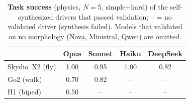 \begin{table}[H]
\centering\small
\setlength{\tabcolsep}{4pt}
\begin{tabular}{lcccc}
\toprule
 & \textbf{Opus} & \textbf{Sonnet} & \textbf{Haiku} & \textbf{DeepSeek} \\
\midrule
Skydio~X2 (fly)  & 1.00 & 0.95 & 1.00 & 0.82 \\
Go2 (walk)       & 0.70 & 0.82 & --   & --   \\
H1 (biped)       & 0.50 & --   & --   & --   \\
\bottomrule
\end{tabular}
\caption{\textbf{Task success} (physics, $N{=}5$, simple+hard) of the
self-synthesized drivers that passed validation; -- = no validated driver
(synthesis failed). Models that validated on no morphology (Nova, Ministral,
Qwen) are omitted.}
\label{tab:xmorph-task}
\end{table}
